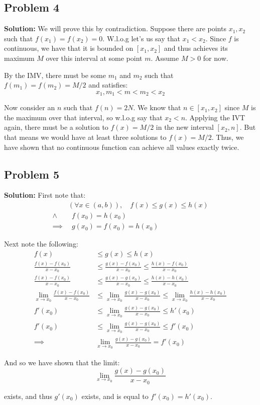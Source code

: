 \documentclass{article}
\begin{document}
\subsection*{Problem 4}
\noindent\textbf{Solution:} We will prove this by contradiction. Suppose there are points $x_1,x_2$ such that $f(x_1)=f(x_2)=0$. W.l.o.g let's us say that $x_1<x_2$. Since $f$ is continuous, we have that it is bounded on $[x_1,x_2]$ and thus achieves its maximum $M$ over this interval at some point $m$. Assume $M>0$ for now.

By the IMV, there must be some $m_1$ and $m_2$ such that $f(m_1)=f(m_2)=M/2$ and satisfies:
$$x_1,m_1<m<m_2<x_2$$

Now consider an $n$ such that $f(n)=2N$. We know that $n\in[x_1,x_2]$ since $M$ is the maximum over that interval, so w.l.o.g say that $x_2<n$. Applying the IVT again, there must be a solution to $f(x)=M/2$ in the new interval $[x_2,n]$. But that means we would have at least three solutions to $f(x)=M/2$. Thus, we have shown that no continuous function can achieve all values exactly twice.

\subsection*{Problem 5}
\noindent\textbf{Solution:} First note that:
\begin{align*}
  &(\forall x\in (a,b)),\quad f(x)\le g(x)\le h(x)\\
  \wedge&\,\,\,f(x_0)=h(x_0)\\
  \implies&\,\,\,g(x_0)=f(x_0)=h(x_0)
\end{align*}

Next note the following:
\begin{align*}
  f(x)&\le g(x)\le h(x)\\
  \frac{f(x)-f(x_0)}{x-x_0}&\le\frac{g(x)-f(x_0)}{x-x_0}\le\frac{h(x)-f(x_0)}{x-x_0}\\
  \frac{f(x)-f(x_0)}{x-x_0}&\le\frac{g(x)-g(x_0)}{x-x_0}\le\frac{h(x)-h(x_0)}{x-x_0}\tag{$g(x_0)=f(x_0)=h(x_0)$}\\
  \lim_{x\to x_0}\frac{f(x)-f(x_0)}{x-x_0}&\le\lim_{x\to x_0}\frac{g(x)-g(x_0)}{x-x_0}\le\lim_{x\to x_0}\frac{h(x)-h(x_0)}{x-x_0}\tag{squeeze theorem}\\
  f'(x_0)&\le\lim_{x\to x_0}\frac{g(x)-g(x_0)}{x-x_0}\le h'(x_0)\tag{def. of derivative}\\
  f'(x_0)&\le\lim_{x\to x_0}\frac{g(x)-g(x_0)}{x-x_0}\le f'(x_0)\tag{$f'(x_0)=h'(x_0)$}\\
  \implies&\lim_{x\to x_0}\frac{g(x)-g(x_0)}{x-x_0}=f'(x_0)\tag{squeeze theorem}
\end{align*}

And so we have shown that the limit:
$$\lim_{x\to x_0}\frac{g(x)-g(x_0)}{x-x_0}$$

exists, and thus $g'(x_0)$ exists, and is equal to $f'(x_0)=h'(x_0)$.
\end{document}
